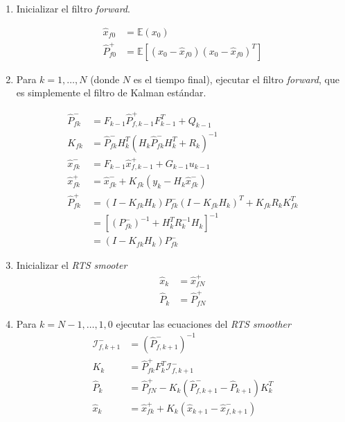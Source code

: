 \begin{enumerate}
    \item Inicializar el filtro \textit{forward}.
    
    \[
    \begin{aligned}
    \hat{x}_{f0} &= \mathbb{E}(x_0) \\
    \hat{P}^{+}_{f0} &= \mathbb{E}\left[(x_0 - \hat{x}_{f0})(x_0 - \hat{x}_{f0})^{T}\right] 
    \end{aligned}
    \]
    
    \item Para \(k = 1, \dots, N\) (donde \(N\) es el tiempo final), ejecutar el filtro \textit{forward}, que es simplemente el filtro de Kalman estándar. 
    
    \[
    \begin{aligned}
    \hat{P}^{-}_{fk} &= F_{k-1}\hat{P}^{+}_{f,k-1}F_{k-1}^{T} + Q_{k-1} \\ 
    K_{fk} &= \hat{P}^{-}_{fk} H_k^{T} (H_k \hat{P}^{-}_{fk}H_k^{T} + R_k)^{-1}  \\
    \hat{x}^{-}_{fk} &= F_{k-1}\hat{x}^{+}_{f,k-1} + G_{k-1}u_{k-1} \\
    \hat{x}^{+}_{fk} &= \hat{x}^{-}_{fk} + K_{fk} \left(y_k - H_k \hat{x}^{-}_{fk} \right)\\ 
    \hat{P}^{+}_{fk} &= (I - K_{fk}H_k) P^{-}_{fk} (I-K_{fk}H_k)^{T} + K_{fk}R_{k}K_{fk}^{T} \\
    &= \left[ (P^{-}_{fk})^{-1} + H_k^{T} R_{k}^{-1}H_k\right]^{-1} \\ 
    &= (I - K_{fk}H_k)P^{-}_{fk}
    \end{aligned}
    \]
    
    \item Inicializar el \textit{RTS smooter} 
    \[
    \begin{aligned}
    \hat{x}_{k} &= \hat{x}^{+}_{fN} \\
    \hat{P}_k &= \hat{P}^{+}_{fN}
    \end{aligned}
    \]
    \item Para \(k = N-1, \dots, 1, 0\) ejecutar las ecuaciones del \textit{RTS smoother} 
    \[
    \begin{aligned}
    \mathcal{I}^{-}_{f, k+1} &= \left( \hat{P}^{-}_{f, k+1}\right)^{-1} \\
    K_k &= \hat{P}^{+}_{fk} F_{k}^{T} \mathcal{I}^{-}_{f, k+1} \\
    \hat{P}_k &= \hat{P}^{+}_{fN} - K_k (\hat{P}^{-}_{f, k+1} - \hat{P}_{k+1})K_k^{T} \\ 
    \hat{x}_k &= \hat{x}^{+}_{fk} + K_k(\hat{x}_{k+1} - \hat{x}^{-}_{f,k+1})
    \end{aligned}
    \]
\end{enumerate}








